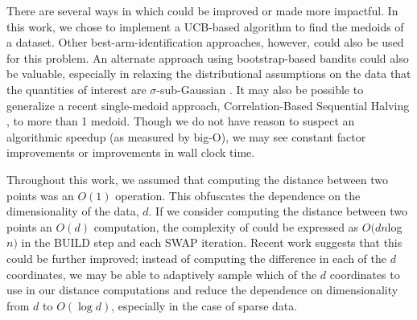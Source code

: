 
There are several ways in which \algname could be improved or made more impactful. In this work, we chose to implement a UCB-based algorithm to find the medoids of a dataset. Other best-arm-identification approaches, however, could also be used for this problem. 
An alternate approach using bootstrap-based bandits could also be valuable, especially in relaxing the distributional assumptions on the data that the quantities of interest are $\sigma$-sub-Gaussian \cite{wang2020bootstrap, kveton2019abootstrap, kveton2019bbootstrap}. It may also be possible to generalize a recent single-medoid approach, Correlation-Based Sequential Halving \cite{baharav2019ultra}, to more than 1 medoid. Though we do not have reason to suspect an algorithmic speedup (as measured by big-O), we may see constant factor improvements or improvements in wall clock time.

Throughout this work, we assumed that computing the distance between two points was an $O(1)$ operation. This obfuscates the dependence on the dimensionality of the data, $d$. If we consider computing the distance between two points an $O(d)$ computation, the complexity of \algname could be expressed as $O(dn$log$n)$ in the BUILD step and each SWAP iteration. Recent work \cite{bagaria2018adaptive} suggests that this could be further improved; instead of computing the difference in each of the $d$ coordinates, we may be able to adaptively sample which of the $d$ coordinates to use in our distance computations and reduce the dependence on dimensionality from $d$ to $O(\log d)$, especially in the case of sparse data.


